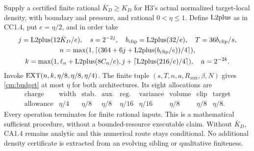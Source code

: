 \begin{theorem}\label{cm:selector}
Supply a certified finite rational $\bar K_D\ge K_D$ for H3's actual
normalized target-local density, with boundary and pressure, and rational
$0<\eta\le1$. Define $\operatorname{L2plus}$ as in CC1.4, put $e=\eta/2$, and in order take
\begin{gather*}
 j=\operatorname{L2plus}(12\bar K_D/e),\quad s=2^{-2j},\quad
 b_{\mathrm{clip}}=\operatorname{L2plus}(32/e),\quad T=36b_{\mathrm{clip}}/s,\\
 n=\max(1,\lceil(364+6j+\operatorname{L2plus}(b_{\mathrm{clip}}/e))/4\rceil),\\
 k=\max(1,\ell_n+\operatorname{L2plus}(8C_n/e),
                 j+\lceil\operatorname{L2plus}(216/e)/4\rceil),\quad a=2^{-2k}.
\end{gather*}
Invoke $\operatorname{EXT}(n,k,\eta/8,\eta/8,\eta/4)$. The finite tuple
$(s,T,n,a,R_{\mathrm{aux}},\beta,N)$ gives \eqref{cm:budget} at most $\eta$
for both architectures. Its eight allocations are
\[
\begin{array}{c|cccccccc}
\text{charge}&\text{width}&\text{stab.}&\text{aux.}&\text{reg.}&
 \text{variance}&\text{volume}&\text{clip}&\text{target}\\ \hline
\text{allowance}&\eta/4&\eta/8&\eta/8&\eta/16&
 \eta/16&\eta/8&\eta/8&\eta/8 .
\end{array}
\]
Every operation terminates for finite rational inputs. This is a mathematical
sufficient procedure, without a bounded-resource executable claim.
Without $\bar K_D$, CA1.4 remains analytic and this numerical route stays
conditional. No additional density certificate is extracted from an
evolving sibling or qualitative finiteness.
\end{theorem}


